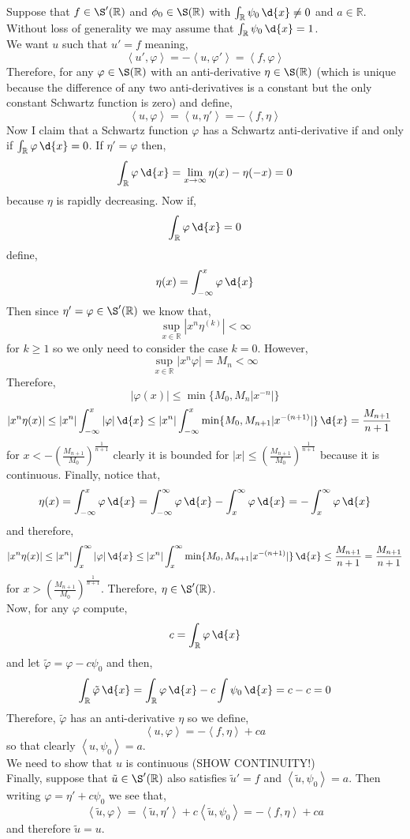 \documentclass[12pt]{article}
\newcommand{\inner}[2]{\left< #1, #2 \right>}
\newcommand{\R}{\mathbb{R}}
\begin{document}
Suppose that $f \in \S'(\R)$ and $\phi_0 \in \S(\R)$ with $\int_\R \psi_0 \, \d{x} \neq 0$ and $a \in \R$. Without loss of generality we may assume that $\int_\R \psi_0 \, \d{x} = 1$.
\bigskip\\
We want $u$ such that $u' = f$ meaning,
\[ \inner{u'}{\varphi} = - \inner{u}{\varphi'} = \inner{f}{\varphi} \]
Therefore, for any $\varphi \in \S(\R)$ with an anti-derivative $\eta \in \S(\R)$ (which is unique because the difference of any two anti-derivatives is a constant but the only constant Schwartz function is zero) and define,
\[ \inner{u}{\varphi} = \inner{u}{\eta'} = - \inner{f}{\eta} \]
Now I claim that a Schwartz function $\varphi$ has a Schwartz anti-derivative if and only if $\int_\R \varphi \, \d{x} = 0$. If $\eta' = \varphi$ then,
\[ \int_\R \varphi \, \d{x} = \lim_{x \to \infty} \eta(x) - \eta(-x) = 0 \]
because $\eta$ is rapidly decreasing. Now if,
\[ \int_\R \varphi \, \d{x} = 0 \]
define,
\[ \eta(x) = \int_{-\infty}^x \varphi \, \d{x} \]
Then since $\eta' = \varphi \in \S'(\R)$ we know that,
\[ \sup_{x \in \R} | x^n \eta^{(k)} | < \infty \]
for $k \ge 1$ so we only need to consider the case $k = 0$. However,
\[ \sup_{x \in \R} | x^{n} \varphi | = M_n < \infty \]
Therefore, 
\[ |\varphi(x)| \le \min \{ M_0, M_n |x^{-n}| \} \]
\begin{align*}
| x^n \eta(x)| & \le |x^n| \int_{-\infty}^{x} |\varphi| \, \d{x} \le |x^n| \int_{-\infty}^{x} \min \{ M_0, M_{n+1} |x^{-(n+1)}| \} \, \d{x} = \frac{M_{n+1}}{n+1}
\end{align*}
for $x < - \left( \frac{M_{n+1}}{M_0} \right)^{\frac{1}{n+1}}$ clearly it is bounded for $|x| \le \left( \frac{M_{n+1}}{M_0} \right)^{\frac{1}{n+1}}$ because it is continuous. Finally, notice that,
\[ \eta(x) = \int_{-\infty}^x \varphi \, \d{x} = \int_{-\infty}^\infty \varphi \, \d{x} - \int_x^{\infty} \varphi \, \d{x} = - \int_x^\infty \varphi \, \d{x} \]
and therefore,
\[ |x^n \eta(x)| \le |x^n| \int_x^\infty | \varphi| \, \d{x} \le |x^n| \int_x^\infty \min \{ M_0, M_{n+1} |x^{-(n+1)}| \} \, \d{x} \le \frac{M_{n+1}}{n+1} = \frac{M_{n+1}}{n+1} \]
for $x > \left( \frac{M_{n+1}}{M_0} \right)^{\frac{1}{n+1}}$. Therefore, $\eta \in \S'(\R)$.
\bigskip\\
Now, for any $\varphi$ compute,
\[ c = \int_\R \varphi \, \d{x} \]
and let $\tilde{\varphi} = \varphi - c \psi_0$ and then,
\[ \int_\R \tilde{\varphi} \, \d{x} = \int_\R \varphi \, \d{x} - c \int \psi_0 \, \d{x} = c - c = 0 \]
Therefore, $\tilde{\varphi}$ has an anti-derivative $\eta$ so we define,
\[ \inner{u}{\varphi} = - \inner{f}{\eta} + c a \]
so that clearly $\inner{u}{\psi_0} = a$. 
\bigskip\\
We need to show that $u$ is continuous (SHOW CONTINUITY!)
\bigskip\\
Finally, suppose that $\tilde{u} \in \S'(\R)$ also satisfies $\tilde{u}' = f$ and $\inner{\tilde{u}}{\psi_0} = a$. Then writing $\varphi = \eta' + c \psi_0$ we see that,
\[ \inner{\tilde{u}}{\varphi} = \inner{\tilde{u}}{\eta'} + c \inner{\tilde{u}}{\psi_0} = - \inner{f}{\eta} + c a \]
and therefore $\tilde{u} = u$.
\end{document}
